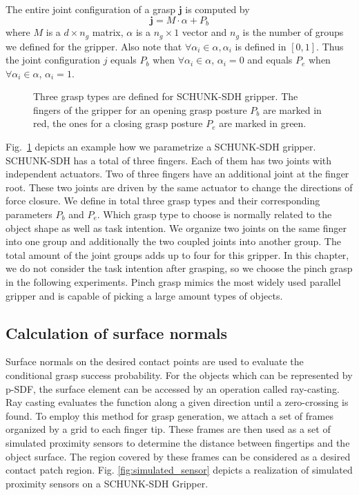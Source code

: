 The entire joint configuration of a grasp $\bm{j}$ is computed by 
\begin{equation}
\bm{j} = M \cdot \alpha + P_b
\label{equ:eigen_grasp}
\end{equation}
where $M$ is a $d \times n_g$ matrix, $\alpha$ is a $n_g \times 1$ vector and $n_g$ is the number of groups we defined for the gripper. Also note that $\forall \alpha_i \in \alpha, \alpha_i$ is defined in $[0,1]$. Thus the joint configuration $j$ equals $P_b$ when $\forall \alpha_i \in \alpha$, $\alpha_i = 0$ and equals $P_e$ when $\forall \alpha_i \in \alpha$, $\alpha_i = 1$. 

\begin{figure}[!htbp]
\centering
\def\svgwidth{1\linewidth}

\caption{Three grasp types are defined for SCHUNK-SDH gripper. The fingers of the gripper for an opening grasp posture $P_b$ are marked in red, the ones for a closing grasp posture $P_e$ are marked in green.}
\label{fig:grasp_types}
\end{figure}	

Fig.~\ref{fig:grasp_types} depicts an example how we parametrize a SCHUNK-SDH gripper. SCHUNK-SDH has a total of three fingers. Each of them has two joints with independent actuators. Two of three fingers have an additional joint at the finger root. These two joints are driven by the same actuator to change the directions of force closure. We define in total three grasp types and their corresponding parameters $P_b$ and $P_e$. Which grasp type to choose is normally related to the object shape as well as task intention. We organize two joints on the same finger into one group and additionally the two coupled joints into another group.  The total amount of the joint groups adds up to four for this gripper. In this chapter, we do not consider the task intention after grasping, so we choose the pinch grasp in the following experiments. Pinch grasp mimics the most widely used parallel gripper and is capable of picking a large amount types of objects. 
 

\subsection{Calculation of surface normals}
Surface normals on the desired contact points are used to evaluate the conditional grasp success probability. For the objects which can be represented by p-SDF, the surface element can be accessed by an operation called ray-casting. Ray casting evaluates the function along a given direction until a zero-crossing is found. To employ this method for grasp generation, we attach a set of frames organized by a grid to each finger tip. These frames are then used as a set of simulated proximity sensors to determine the distance between fingertips and the object surface. The region covered by these frames can be considered as a desired contact patch region. Fig. \ref{fig:simulated_sensor} depicts a realization of simulated proximity sensors on a SCHUNK-SDH Gripper.

